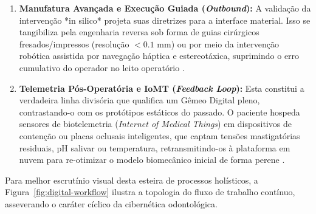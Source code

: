 \begin{enumerate}
    \item \textbf{Manufatura Avançada e Execução Guiada (\textit{Outbound}):} A validação da intervenção *in silico* projeta suas diretrizes para a interface material. Isso se tangibiliza pela engenharia reversa sob forma de guias cirúrgicos fresados/impressos (resolução $< 0.1$ mm) ou por meio da intervenção robótica assistida por navegação háptica e estereotáxica, suprimindo o erro cumulativo do operador no leito operatório \cite{xing2024clinical}.
    
    \item \textbf{Telemetria Pós-Operatória e IoMT (\textit{Feedback Loop}):} Esta constitui a verdadeira linha divisória que qualifica um Gêmeo Digital pleno, contrastando-o com os protótipos estáticos do passado. O paciente hospeda sensores de biotelemetria (\textit{Internet of Medical Things}) em dispositivos de contenção ou placas oclusais inteligentes, que captam tensões mastigatórias residuais, pH salivar ou temperatura, retransmitindo-os à plataforma em nuvem para re-otimizar o modelo biomecânico inicial de forma perene \cite{infante2025distributed}.
\end{enumerate}

Para melhor escrutínio visual desta esteira de processos holísticos, a Figura~\ref{fig:digital-workflow} ilustra a topologia do fluxo de trabalho contínuo, asseverando o caráter cíclico da cibernética odontológica.

